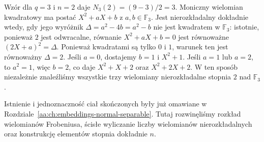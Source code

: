 \begin{przyklad}
\label{aa:prz:finite-quadratics-three}
Wzór dla $q=3$ i $n=2$ daje
$N_3(2)=(9-3)/2=3$.
Moniczny wielomian kwadratowy ma postać
$X^2+aX+b$ z $a,b\in\mathbb F_3$.
Jest nierozkładalny dokładnie wtedy, gdy jego
wyróżnik $\Delta=a^2-4b=a^2-b$ nie jest kwadratem
w $\mathbb F_3$: istotnie, ponieważ $2$ jest
odwracalne, równanie $X^2+aX+b=0$ jest równoważne
$(2X+a)^2=\Delta$. Ponieważ kwadratami są tylko $0$ i $1$,
warunek ten jest równoważny $\Delta=2$.
Jeśli $a=0$, dostajemy $b=1$ i $X^2+1$.
Jeśli $a=1$ lub $a=2$, to $a^2=1$, więc $b=2$,
co daje $X^2+X+2$ oraz $X^2+2X+2$.
W ten sposób niezależnie znaleźliśmy wszystkie trzy
wielomiany nierozkładalne stopnia $2$ nad $\mathbb F_3$.
\end{przyklad}

\begin{uwaga}\label{aa:uw:finite-field-previous}
Istnienie i jednoznaczność ciał skończonych były już
omawiane w Rozdziale~\ref{aa:ch:embeddings-normal-separable}.
Tutaj rozwinęliśmy rozkład wielomianów Frobeniusa,
ścisłe wyliczanie liczby wielomianów nierozkładalnych
oraz konstrukcję elementów stopnia dokładnie $n$.
\end{uwaga}

